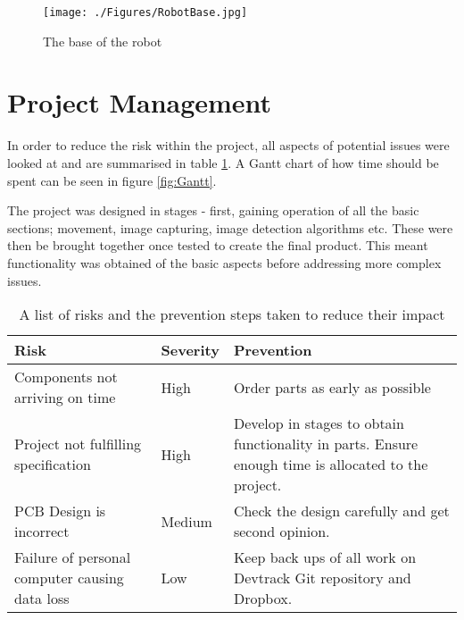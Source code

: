 \begin{figure}
\centering
\texttt{[image: ./Figures/RobotBase.jpg]}
\caption{The base of the robot}
\label{fig:RobotBase}
\end{figure}

\section{Project Management}
In order to reduce the risk within the project, all aspects of potential issues were looked at and are summarised in table \ref{tab:risk}. A Gantt chart of how time should be spent can be seen in figure \ref{fig:Gantt}. 

The project was designed in stages - first, gaining operation of all the basic sections; movement, image capturing, image detection algorithms etc. These were then be brought together once tested to create the final product. This meant functionality was obtained of the basic aspects before addressing more complex issues. 
\begin{table}
\begin{tabular}{|p{6cm}|p{2cm}|p{6cm}|}\hline
Risk						&	Severity	&	Prevention \\ \hline
Components not arriving on time	&	High		&	Order parts as early as possible \\
Project not fulfilling specification				&	High		&	Develop in stages to obtain functionality in parts. Ensure enough time is allocated to the project.	\\
PCB Design is incorrect		&	Medium		&	Check the design carefully and get second opinion. \\
Failure of personal computer causing data loss & Low	& 	Keep back ups of all work on Devtrack Git repository and Dropbox.\\

\hline
\end{tabular}
\caption{A list of risks and the prevention steps taken to reduce their impact}
\label{tab:risk}
\end{table}
